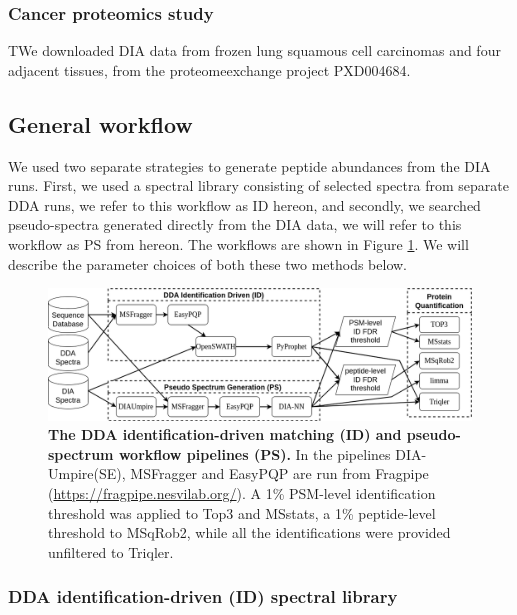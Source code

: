 \documentclass[10pt,letterpaper]{article}
\begin{document}
\subsubsection*{Cancer proteomics study}
TWe downloaded DIA data from  frozen lung squamous cell carcinomas and four adjacent tissues, from the proteomeexchange project PXD004684.

\subsection*{General workflow}

We used two separate strategies to generate peptide abundances from the DIA runs. First, we used a spectral library consisting of selected spectra from separate DDA runs, we refer to this workflow as ID hereon, and secondly, we searched pseudo-spectra generated directly from the DIA data, we will refer to this workflow as PS from hereon. The workflows are shown in Figure \ref{fig:flowchart}. We will describe the parameter choices of both these two methods below.

\begin{figure}[htp]
    \centering
    \includegraphics[width=1.0\linewidth]{./img/methods.png} 
    \caption{{\bf The DDA identification-driven matching (ID) and pseudo-spectrum workflow pipelines (PS).} In the pipelines DIA-Umpire(SE), MSFragger and EasyPQP are run from Fragpipe (\protect\url{https://fragpipe.nesvilab.org/}). A 1\% PSM-level identification threshold was applied to Top3 and MSstats, a 1\% peptide-level threshold to MSqRob2, while all the identifications were provided unfiltered to Triqler. \label{fig:flowchart}}  
\end{figure}



\subsubsection*{DDA identification-driven (ID) spectral library}
\end{document}
